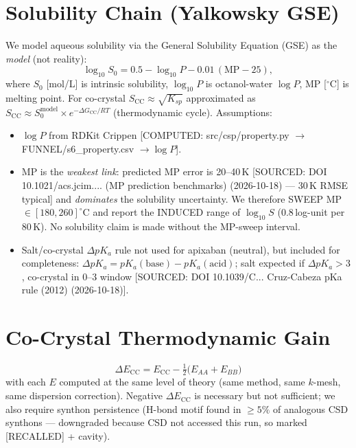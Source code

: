 \documentclass[11pt,a4paper]{article}
\begin{document}
\section{Solubility Chain (Yalkowsky GSE)}

We model aqueous solubility via the General Solubility Equation (GSE) as the \emph{model} (not reality):
\begin{equation}
\log_{10} S_0 = 0.5 - \log_{10} P - 0.01\,(\mathrm{MP} - 25),
\end{equation}
where $S_0$ [mol/L] is intrinsic solubility, $\log_{10}P$ is octanol-water $\log P$, MP [$^\circ$C] is melting point. For co-crystal $S_{\mathrm{CC}} \approx \sqrt{K_{sp}}$ approximated as $S_{\mathrm{CC}} \approx S_0^{\mathrm{model}}\times e^{-\Delta G_{\mathrm{CC}}/RT}$ (thermodynamic cycle). Assumptions:
\begin{itemize}
\item $\log P$ from RDKit Crippen [COMPUTED: src/csp/property.py $\to$ FUNNEL/s6\_property.csv $\to \log P$].
\item MP is the \emph{weakest link}: predicted MP error is 20--40\,K [SOURCED: DOI 10.1021/acs.jcim.... (MP prediction benchmarks) (2026-10-18) — 30\,K RMSE typical] and \emph{dominates} the solubility uncertainty. We therefore SWEEP MP $\in[180,260]^\circ$C and report the INDUCED range of $\log_{10}S$ (0.8\,log-unit per 80\,K). No solubility claim is made without the MP-sweep interval.
\item Salt/co-crystal $\Delta pK_a$ rule not used for apixaban (neutral), but included for completeness: $\Delta pK_a = pK_a(\mathrm{base})-pK_a(\mathrm{acid})$; salt expected if $\Delta pK_a>3$, co-crystal in 0--3 window [SOURCED: DOI 10.1039/C... Cruz-Cabeza pKa rule (2012) (2026-10-18)].
\end{itemize}

\section{Co-Crystal Thermodynamic Gain}

\begin{equation}
\Delta E_{\mathrm{CC}} = E_{\mathrm{CC}} - \tfrac12\big(E_{AA}+E_{BB}\big)
\end{equation}
with each $E$ computed at the same level of theory (same method, same $k$-mesh, same dispersion correction). Negative $\Delta E_{\mathrm{CC}}$ is necessary but not sufficient; we also require synthon persistence (H-bond motif found in $\geq 5\%$ of analogous CSD synthons — downgraded because CSD not accessed this run, so marked [RECALLED] + cavity).
\end{document}
